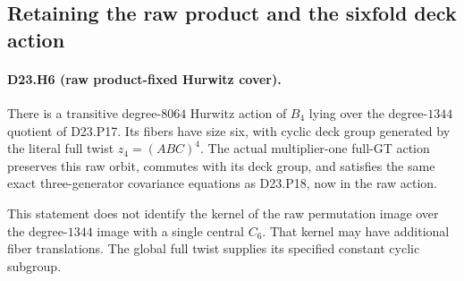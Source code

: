\subsection{Retaining the raw product and the sixfold deck action}

\paragraph{D23.H6 (raw product-fixed Hurwitz cover).}
There is a transitive degree-$8064$ Hurwitz action of $B_4$
lying over the degree-$1344$ quotient of D23.P17. Its fibers
have size six, with cyclic deck group generated by the
literal full twist $z_4=(ABC)^4$. The actual multiplier-one
full-GT action preserves this raw orbit, commutes with its
deck group, and satisfies the same exact three-generator
covariance equations as D23.P18, now in the raw action.

This statement does not identify the kernel of the raw
permutation image over the degree-$1344$ image with a
single central $C_6$. That kernel may have additional
fiber translations. The global full twist supplies its
specified constant cyclic subgroup.

